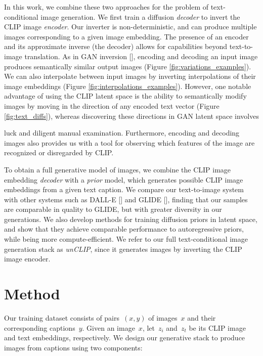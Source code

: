 In this work, we combine these two approaches for the problem of text-conditional image generation. We first train a diffusion \textit{decoder} to invert the CLIP image \textit{encoder}. Our inverter is non-deterministic, and can produce multiple images corresponding to a given image embedding. The presence of an encoder and its approximate inverse (the decoder) allows for capabilities beyond text-to-image translation. As in GAN inversion [], encoding and decoding an input image produces semantically similar output images (Figure \ref{fig:variations_examples}). We can also interpolate between input images by inverting interpolations of their image embeddings (Figure \ref{fig:interpolations_examples}). However, one notable advantage of using the CLIP latent space is the ability to semantically modify images by moving in the direction of any encoded text vector (Figure \ref{fig:text_diffs}), whereas discovering these directions in GAN latent space involves


\restoregeometry luck and diligent manual examination. Furthermore, encoding and decoding images also provides us with a tool for observing which features of the image are recognized or disregarded by CLIP.

To obtain a full generative model of images, we combine the CLIP image embedding \textit{decoder} with a \textit{prior} model, which generates possible CLIP image embeddings from a given text caption. We compare our text-to-image system with other systems such as DALL-E [] and GLIDE [], finding that our samples are comparable in quality to GLIDE, but with greater diversity in our generations. We also develop methods for training diffusion priors in latent space, and show that they achieve comparable performance to autoregressive priors, while being more compute-efficient. We refer to our full text-conditional image generation stack as \textit{unCLIP}, since it generates images by inverting the CLIP image encoder.

\section{Method}
Our training dataset consists of pairs~$(x,y)$ of images~$x$ and their corresponding captions~$y$. Given an image~$x$, let~$z_i$ and~$z_t$ be its CLIP image and text embeddings, respectively. We design our generative stack to produce images from captions using two components:

